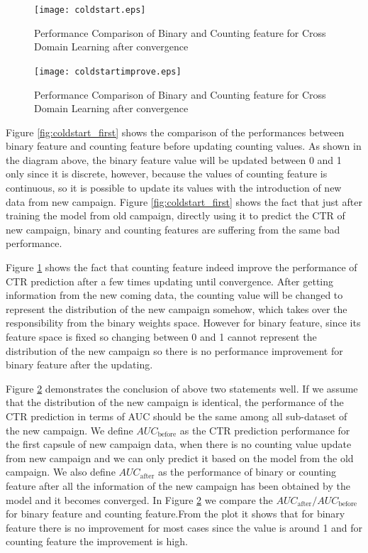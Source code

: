 \begin{figure}[t]
\centering
\texttt{[image: coldstart.eps]}
\caption{Performance Comparison of Binary and Counting feature for Cross Domain Learning after convergence}
\label{fig:coldstart}
\end{figure}

\begin{figure}[t]
\centering
\texttt{[image: coldstartimprove.eps]}
\caption{Performance Comparison of Binary and Counting feature for Cross Domain Learning after convergence}
\label{fig:coldstartimprove}
\end{figure}

Figure \ref{fig:coldstart_first} shows the comparison of the performances between binary feature and counting feature before updating counting values. As shown in the diagram above, the binary feature value will be updated between 0 and 1 only since it is discrete, however, because the values of counting feature is continuous, so it is possible to update its values with the introduction of new data from new campaign. Figure \ref{fig:coldstart_first} shows the fact that just after training the model from old campaign, directly using it to predict the CTR of new campaign, binary and counting features are suffering from the same bad performance. 

Figure \ref{fig:coldstart} shows the fact that counting feature indeed improve the performance of CTR prediction after a few times updating until convergence. After getting information from the new coming data, the counting value will be changed to represent the distribution of the new campaign somehow, which takes over the responsibility from the binary weights space. However for binary feature, since its feature space is fixed so changing between 0 and 1 cannot represent the distribution of the new campaign so there is no performance improvement for binary feature after the updating. 

Figure \ref{fig:coldstartimprove} demonstrates the conclusion of above two statements well. If we assume that the distribution of the new campaign is identical, the performance of the CTR prediction in terms of AUC should be the same among all sub-dataset of the new campaign. We define  \(AUC_{\text{before}}\) as the CTR prediction performance for the first capsule of new campaign data, when there is no counting value update from new campaign and we can only predict it based on the model from the old campaign. We also define \(AUC_{\text{after}}\) as the performance of binary or counting feature after all the information of the new campaign has been obtained by the model and it becomes converged. In Figure \ref{fig:coldstartimprove} we compare the \({AUC_{\text{after}}}/{AUC_{\text{before}}}\)
for binary feature and counting feature.From the plot it shows that for binary feature there is no improvement for most cases since the value is around 1 and for counting feature the improvement is high. 



